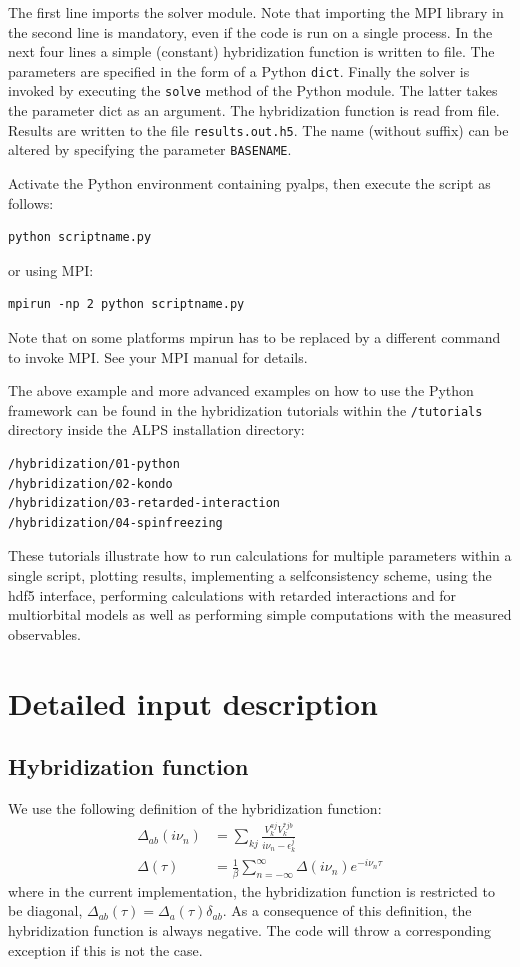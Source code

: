 \documentclass[aps,prb,floatfix,superscriptaddress,twocolumn,notitlepage]{revtex4-1}
\newcommand{\iom}{{\ensuremath{i\nu}}}
\begin{document}
The first line imports the solver module. Note that importing the MPI library in the second line is mandatory, even if the code is run on a single process. In the next four lines a simple (constant) hybridization function is written to file.
The parameters are specified in the form of a Python \verb#dict#.
Finally the solver is invoked by executing the \verb#solve# method of the Python module. The latter takes the parameter dict as an argument. The hybridization function is read from file. Results are written to the file \verb#results.out.h5#. The name (without suffix) can be altered by specifying the parameter \verb#BASENAME#.

Activate the Python environment containing pyalps, then execute the script as follows:
\begin{verbatim}
python scriptname.py
\end{verbatim}
or using MPI:
\begin{verbatim}
mpirun -np 2 python scriptname.py
\end{verbatim}
Note that on some platforms mpirun has to be replaced by a different command to invoke MPI. See your MPI manual for details. 

The above example and more advanced examples on how to use the Python framework can be found in the hybridization tutorials within the \verb#/tutorials# directory inside the ALPS installation directory:
\begin{verbatim}
/hybridization/01-python
/hybridization/02-kondo
/hybridization/03-retarded-interaction
/hybridization/04-spinfreezing
\end{verbatim}

These tutorials illustrate how to run calculations for multiple parameters within a single script, plotting results, implementing a selfconsistency scheme, using the hdf5 interface, performing calculations with retarded interactions and for multiorbital models as well as performing simple computations with the measured observables.

\section{Detailed input description}

\subsection{Hybridization function}
\label{hybridization}
We use the following definition of the hybridization function:
\begin{align}
\Delta_{ab}(\iom_{n}) &= \sum_{kj}\frac{V_{k}^{aj}V_{k}^{*jb}}{\iom_{n}-\epsilon_{k}^{j}}\\
\Delta(\tau) &= \frac{1}{\beta}\sum_{n=-\infty}^{\infty}\Delta(\iom_{n})e^{-\iom_{n}\tau}
\end{align}
where in the current implementation, the hybridization function is restricted to be diagonal, $\Delta_{ab}(\tau)=\Delta_{a}(\tau)\delta_{ab}$.
As a consequence of this definition, the hybridization function is always negative. The code will throw a corresponding exception if this is not the case.
\end{document}
